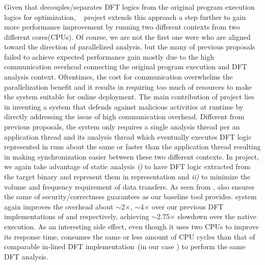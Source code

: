 \documentclass[letterpaper, 10pt]{article}
\begin{document}
\begin{small}
\subsubsection*{\SR} Given that \TFA decouples/separates DFT logics from the
original program execution logics for optimization, \SR~\cite{sreplica:2013ccs}
project extends this approach a step further to gain more performance
improvement by running two different contexts from two different cores(CPUs). 
%
Of course, we are not the first one were who are aligned toward the direction
of parallelized analysis, but the many of previous proposals failed to achieve
expected performance gain mostly due to the high communication overhead
connecting the original program execution and DFT analysis context.
Oftentimes, the cost for communication overwhelms the parallelization benefit
and it results in requiring too much of resources to make the system suitable
for online deployment. 
%
The main contribution of \SR project lies in inventing a system that defends
against malicious activities at runtime by directly addressing the issue of
high communication overhead. Different from previous proposals, the system only
requires a single analysis thread per an application thread and its analysis
thread which eventually executes DFT logic represented in \TFA runs about the
same or faster than the application thread resulting in making synchronization
easier between these two different contexts.
%
In \SR project, we again take advantage of static analysis  {\it i)} to have
DFT logic extracted from the target binary and represent them in \TFA
representation and {\it ii)} to minimize the volume and frequency requirement
of data transfers. As seen from \TFA, \SR also ensures the same of
security/correctness guarantees as our baseline tool provides.
%
\SR system again improves the overhead about $\sim$2$\times$, $\sim$4$\times$
over our previous DFT implementations of \TFA and \libdft respectively,
achieving $\sim$2.75$\times$ slowdown over the native execution.
%
As an interesting side effect, even though it uses two CPUs to improve its
response time, \SR consumes the same or less amount of CPU cycles than that of
comparable in-lined DFT implementation~(in our case \TFA) to perform the same
DFT analysis. 


\end{small}
\end{document}
